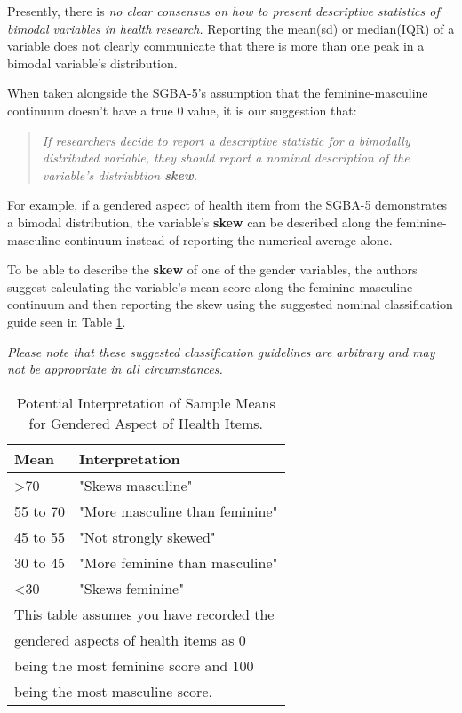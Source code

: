 \documentclass[
]{book}
\begin{document}
Presently, there is \emph{{no clear consensus on how to present descriptive statistics of bimodal variables in health research.}} Reporting the mean(sd) or median(IQR) of a variable does not clearly communicate that there is more than one peak in a bimodal variable's distribution.

When taken alongside the SGBA-5's assumption that the feminine-masculine continuum doesn't have a true 0 value, it is our suggestion that:

\begin{quote}
\emph{If researchers decide to report a descriptive statistic for a bimodally distributed variable, they should report a nominal description of the variable's distriubtion \textbf{skew}.}
\end{quote}

For example, if a gendered aspect of health item from the SGBA-5 demonstrates a bimodal distribution, the variable's \textbf{skew} can be described along the feminine-masculine continuum instead of reporting the numerical average alone.

To be able to describe the \textbf{skew} of one of the gender variables, the authors suggest calculating the variable's mean score along the feminine-masculine continuum and then reporting the skew using the suggested nominal classification guide seen in Table \ref{tab:02-tab}.

\emph{Please note that these suggested classification guidelines are arbitrary and may not be appropriate in all circumstances.}

\begin{table}

\caption{\label{tab:02-tab}Potential Interpretation of Sample Means for Gendered Aspect of Health Items.}
\centering
\begin{tabular}[t]{ll}
\toprule
Mean & Interpretation\\
\midrule
>70 & "Skews masculine"\\
55 to 70 & "More masculine than feminine"\\
45 to 55 & "Not strongly skewed"\\
30 to 45 & "More feminine than masculine"\\
<30 & "Skews feminine"\\
\bottomrule
\multicolumn{2}{l}{\textsuperscript{} This table assumes you have recorded the}\\
\multicolumn{2}{l}{gendered aspects of health items as 0}\\
\multicolumn{2}{l}{being the most feminine score and 100}\\
\multicolumn{2}{l}{being the most masculine score.}\\
\end{tabular}
\end{table}
\end{document}
